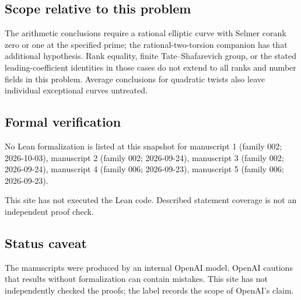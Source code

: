 \documentclass[11pt]{article}
\begin{document}
\subsection{Scope relative to this problem}
The arithmetic conclusions require a rational elliptic curve with Selmer corank zero or one at the specified prime; the rational-two-torsion companion has that additional hypothesis. Rank equality, finite Tate--Shafarevich group, or the stated leading-coefficient identities in those cases do not extend to all ranks and number fields in this problem. Average conclusions for quadratic twists also leave individual exceptional curves untreated.

\subsection{Formal verification}
No Lean formalization is listed at this snapshot for manuscript 1 (family 002; 2026-10-03), manuscript 2 (family 002; 2026-09-24), manuscript 3 (family 002; 2026-09-24), manuscript 4 (family 006; 2026-09-23), manuscript 5 (family 006; 2026-09-23).

This site has not executed the Lean code. Described statement coverage is not an independent proof check.

\subsection{Status caveat}
The manuscripts were produced by an internal OpenAI model. OpenAI cautions that results without formalization can contain mistakes. This site has not independently checked the proofs; the label records the scope of OpenAI's claim.
\end{document}
